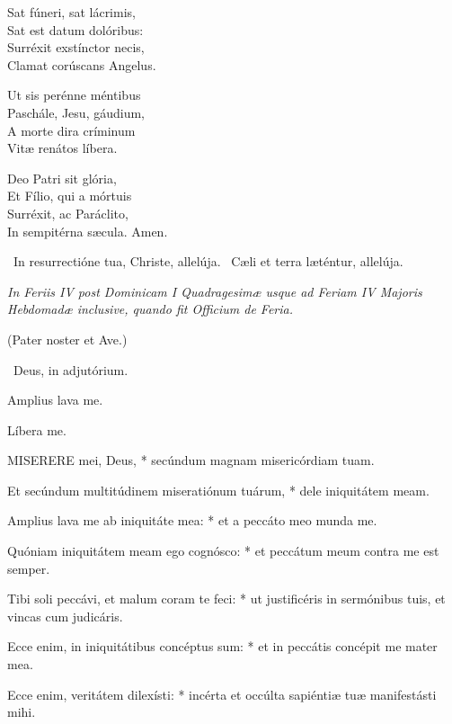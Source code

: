 Sat fúneri, sat lácrimis,\\
Sat est datum dolóribus:\\
Surréxit exstínctor necis,\\
Clamat corúscans Angelus.

Ut sis perénne méntibus\\
Paschále, Jesu, gáudium,\\
A morte dira críminum\\
Vitæ renátos líbera.

Deo Patri sit glória,\\
Et Fílio, qui a mórtuis\\
Surréxit, ac Paráclito,\\
In sempitérna sæcula. Amen.

\V\ In resurrectióne tua, Christe, allelúja. \R\ Cæli et terra læténtur, allelúja.



\sectionornament


\textit{In Feriis IV post Dominicam I Quadragesimæ usque ad Feriam IV Majoris Hebdomadæ inclusive, quando fit Officium de Feria.}

(Pater noster et Ave.)

\V\ Deus, in adjutórium.

 Amplius lava me.


 Líbera me.


\lettrine[lines=2]{M}{ISERERE} mei, Deus, * secúndum magnam misericórdiam tuam.

Et secúndum multitúdinem miseratiónum tuárum, * dele iniquitátem meam.

Amplius lava me ab iniquitáte mea: * et a peccáto meo munda me.

Quóniam iniquitátem meam ego cognósco: * et peccátum meum contra me est semper.

Tibi soli peccávi, et malum coram te feci: * ut justificéris in sermónibus tuis, et vincas cum judicáris.

Ecce enim, in iniquitátibus concéptus sum: * et in peccátis concépit me mater mea.

Ecce enim, veritátem dilexísti: * incérta et occúlta sapiéntiæ tuæ manifestásti mihi.

